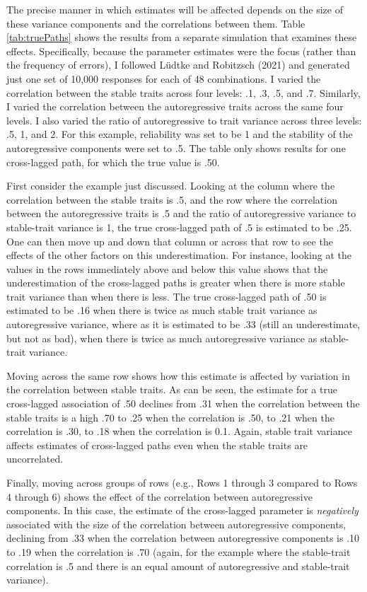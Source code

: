 \documentclass[
  english,
  man,floatsintext]{apa6}
\begin{document}
The precise manner in which estimates will be affected depends on the size of these variance components and the correlations between them. Table \ref{tab:truePaths} shows the results from a separate simulation that examines these effects. Specifically, because the parameter estimates were the focus (rather than the frequency of errors), I followed Lüdtke and Robitzsch (2021) and generated just one set of 10,000 responses for each of 48 combinations. I varied the correlation between the stable traits across four levels: .1, .3, .5, and .7. Similarly, I varied the correlation between the autoregressive traits across the same four levels. I also varied the ratio of autoregressive to trait variance across three levels: .5, 1, and 2. For this example, reliability was set to be 1 and the stability of the autoregressive components were set to .5. The table only shows results for one cross-lagged path, for which the true value is .50.

First consider the example just discussed. Looking at the column where the correlation between the stable traits is .5, and the row where the correlation between the autoregressive traits is .5 and the ratio of autoregressive variance to stable-trait variance is 1, the true cross-lagged path of .5 is estimated to be .25. One can then move up and down that column or across that row to see the effects of the other factors on this underestimation. For instance, looking at the values in the rows immediately above and below this value shows that the underestimation of the cross-lagged paths is greater when there is more stable trait variance than when there is less. The true cross-lagged path of .50 is estimated to be .16 when there is twice as much stable trait variance as autoregressive variance, where as it is estimated to be .33 (still an underestimate, but not as bad), when there is twice as much autoregressive variance as stable-trait variance.

Moving across the same row shows how this estimate is affected by variation in the correlation between stable traits. As can be seen, the estimate for a true cross-lagged association of .50 declines from .31 when the correlation between the stable traits is a high .70 to .25 when the correlation is .50, to .21 when the correlation is .30, to .18 when the correlation is 0.1. Again, stable trait variance affects estimates of cross-lagged paths even when the stable traits are uncorrelated.

Finally, moving across groups of rows (e.g., Rows 1 through 3 compared to Rows 4 through 6) shows the effect of the correlation between autoregressive components. In this case, the estimate of the cross-lagged parameter is \emph{negatively} associated with the size of the correlation between autoregressive components, declining from .33 when the correlation between autoregressive components is .10 to .19 when the correlation is .70 (again, for the example where the stable-trait correlation is .5 and there is an equal amount of autoregressive and stable-trait variance).
\end{document}
